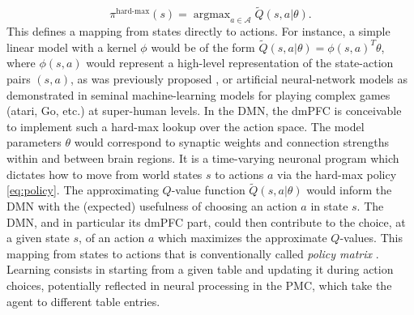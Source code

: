 \documentclass[10pt,letterpaper]{article}
\DeclareMathOperator{\argmax}{argmax}
\begin{document}
\begin{equation}
  \pi^{\text{hard-max}}(s) = \argmax_{a \in \mathcal A}\tilde{Q}(s, a|\theta).
  \label{eq:policy}
\end{equation}
This defines a mapping from states directly to actions.
For instance, a simple linear model with a kernel $\phi$ would be of the
form $\tilde{Q}(s, a|\theta) = \phi(s,a)^T\theta$, where
$\phi(s,a)$ would represent a high-level representation of the state-action pairs
$(s,a)$, as was previously proposed \citep{songNIPS2016},
or artificial neural-network models as demonstrated in 
seminal machine-learning models
\citep{mnih2015,silver2016mastering} for playing complex games (atari, Go, etc.) at super-human levels.
In the DMN, the dmPFC is conceivable to implement such a hard-max lookup
over the action space.
The model
parameters $\theta$ would correspond to synaptic weights and connection strengths within and between
brain regions. It is a time-varying neuronal program which dictates how to move from world states $s$ to actions $a$ via the hard-max policy \eqref{eq:policy}.
The approximating $Q$-value function $\tilde{Q}(s, a|\theta)$ would inform the DMN with the (expected) usefulness of choosing an action $a$ in state $s$.
The DMN, and in particular its dmPFC part, could then contribute to the choice, at a given state $s$, of an action $a$ which maximizes the approximate
$Q$-values.
This mapping from states to actions that is conventionally called
\textit{policy matrix} \citep{mnih2015,silver2016mastering}.
Learning consists in starting from a given table and
updating it during action choices, potentially reflected in neural processing in the PMC,
which take the agent to different table entries.



\end{document}
